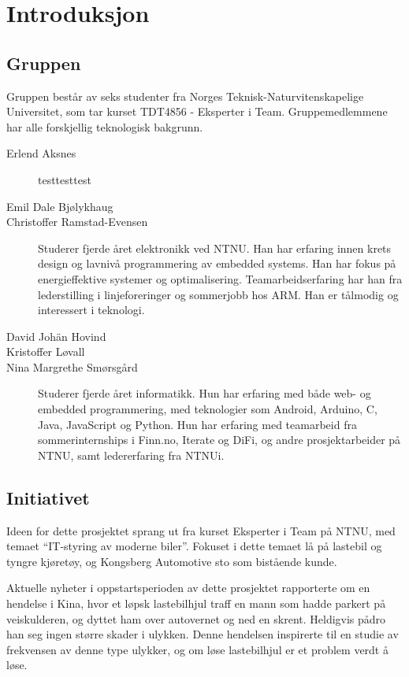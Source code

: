 \chapter{Introduksjon}
\section{Gruppen}
Gruppen består av seks studenter fra Norges Teknisk-Naturvitenskapelige
Universitet, som tar kurset TDT4856 - Eksperter i Team. Gruppemedlemmene
har alle forskjellig teknologisk bakgrunn.
\begin{description}
	\item[Erlend Aksnes] testtesttest%
	\item[Emil Dale Bjølykhaug] %
	\item[Christoffer Ramstad-Evensen] \comment{\hfill \\} Studerer fjerde
  året elektronikk ved NTNU. Han har erfaring innen krets design
  og lavnivå programmering av embedded systems. Han har fokus på energieffektive
  systemer og optimalisering. Teamarbeidserfaring har han fra lederstilling i
  linjeforeringer og sommerjobb hos ARM. Han er tålmodig og interessert i
  teknologi.
	\item[David Johän Hovind] %
	\item[Kristoffer Løvall] %
	\item[Nina Margrethe Smørsgård] \comment{\hfill \\}Studerer fjerde året
	informatikk. Hun har erfaring med både web- og embedded programmering, med
	teknologier som Android, Arduino, C, Java, JavaScript og Python. Hun har
	erfaring med teamarbeid fra sommerinternships i Finn.no, Iterate og DiFi,
	og andre prosjektarbeider på NTNU, samt ledererfaring fra NTNUi.
\end{description}

\section{Initiativet}
Ideen for dette prosjektet sprang ut fra kurset Eksperter i Team på NTNU, med 
temaet ``IT-styring av moderne biler''. Fokuset i dette temaet lå på lastebil 
og tyngre kjøretøy, og Kongsberg Automotive sto som bistående kunde.

Aktuelle nyheter i oppstartsperioden av dette prosjektet rapporterte om en 
hendelse i Kina, hvor et løpsk lastebilhjul traff en mann som hadde parkert på 
veiskulderen, og dyttet ham over autovernet og ned en skrent. Heldigvis pådro 
han seg ingen større skader i ulykken. Denne hendelsen inspirerte til en studie 
av frekvensen av denne type ulykker, og om løse lastebilhjul er et problem 
verdt å løse.

